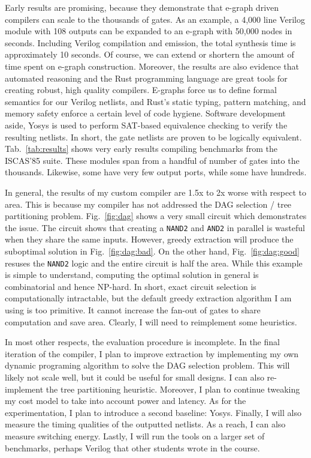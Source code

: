\documentclass[10pt,letterpaper]{article}
\begin{document}
Early results are promising, because they demonstrate that e-graph driven
compilers can scale to the thousands of gates. As an example, a 4,000 line
Verilog module with 108 outputs can be expanded to an e-graph with 50,000 nodes
in seconds. Including Verilog compilation and emission, the total synthesis
time is approximately 10 seconds. Of course, we can extend or shortern the
amount of time spent on e-graph construction. Moreover, the results are also
evidence that automated reasoning and the Rust programming language are great
tools for creating robust, high quality compilers. E-graphs force us to define
formal semantics for our Verilog netlists, and Rust's static typing, pattern
matching, and memory safety enforce a certain level of code hygiene. Software
development aside, Yosys is used to perform SAT-based equivalence checking to
verify the resulting netlists. In short, the gate netlists are proven to be
logically equivalent. Tab.~\ref{tab:results} shows very early results compiling
benchmarks from the ISCAS'85 suite. These modules span from a handful of number
of gates into the thousands. Likewise, some have very few output ports, while
some have hundreds.

In general, the results of my custom compiler are 1.5x to 2x worse with respect
to area. This is because my compiler has not addressed the DAG selection / tree
partitioning problem. Fig.~\ref{fig:dag} shows a very small circuit which
demonstrates the issue. The circuit shows that creating a \texttt{NAND2} and
\texttt{AND2} in parallel is wasteful when they share the same inputs. However,
greedy extraction will produce the suboptimal solution in
Fig.~\ref{fig:dag:bad}. On the other hand, Fig.~\ref{fig:dag:good} resuses the
\texttt{NAND2} logic and the entire circuit is half the area. While this
example is simple to understand, computing the optimal solution in general is
combinatorial and hence NP-hard. In short, exact circuit selection is
computationally intractable, but the default greedy extraction algorithm I am
using is too primitive. It cannot increase the fan-out of gates to share
computation and save area. Clearly, I will need to reimplement some heuristics.

In most other respects, the evaluation procedure is incomplete. In the final
iteration of the compiler, I plan to improve extraction by implementing my own
dynamic programing algorithm to solve the DAG selection problem. This will
likely not scale well, but it could be useful for small designs. I can also
re-implement the tree partitioning heuristic. Moreover, I plan to continue
tweaking my cost model to take into account power and latency. As for the
experimentation, I plan to introduce a second baseline: Yosys. Finally, I will
also measure the timing qualities of the outputted netlists. As a reach, I can
also measure switching energy. Lastly, I will run the tools on a larger set of
benchmarks, perhaps Verilog that other students wrote in the course.
\end{document}
